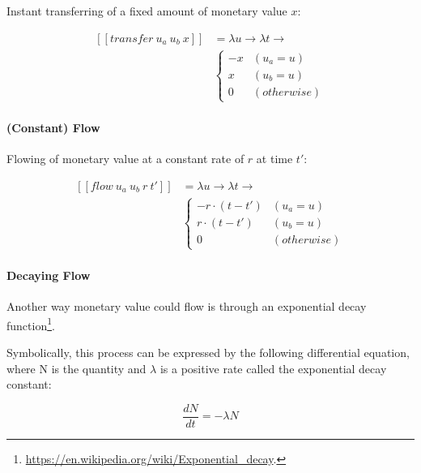 Instant transferring of a fixed amount of monetary value $x$:

\begin{equation}
    \begin{split}
        [\![transfer\ u_a\ u_b\ x]\!] &=
        \lambda u \rightarrow \lambda t \rightarrow \\
        &\begin{cases}
            -x & (u_a = u) \\
             x & (u_b = u) \\
             0 & (otherwise)
        \end{cases}
    \end{split}
\end{equation}

\paragraph{(Constant) Flow}

Flowing of monetary value at a constant rate of $r$ at time $t'$:

\begin{equation}
    \begin{split}
        [\![flow\ u_a\ u_b\ r\ t']\!] &=
        \lambda u \rightarrow \lambda t \rightarrow \\
        &\begin{cases}
            -r \cdot (t - t') & (u_a = u) \\
             r \cdot (t - t') & (u_b = u) \\
                            0 & (otherwise)
        \end{cases}
    \end{split}
\end{equation}

\paragraph{Decaying Flow}

Another way monetary value could flow is through an exponential decay
function\footnote{\url{https://en.wikipedia.org/wiki/Exponential_decay}.}.

Symbolically, this process can be expressed by the following differential equation, where N is the
quantity and $\lambda$ is a positive rate called the exponential decay constant:

\begin{equation}
    {\displaystyle {\frac {dN}{dt}}=-\lambda N}
\end{equation}

